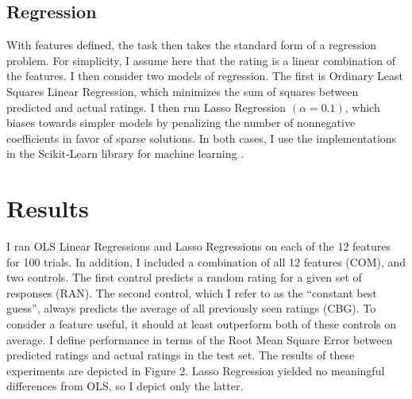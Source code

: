 \subsection{Regression}
With features defined, the task then takes the standard form of a regression problem. For simplicity, I assume here that the rating is a linear combination of the features. I then consider two models of regression. The first is Ordinary Least Squares Linear Regression, which minimizes the sum of squares between predicted and actual ratings. I then run Lasso Regression $(\alpha = 0.1)$, which biases towards simpler models by penalizing the number of nonnegative coefficients in favor of sparse solutions. In both cases, I use the implementations in the Scikit-Learn library for machine learning  \citep{pedregosa2011scikit}.
\section{Results}
I ran OLS Linear Regressions and Lasso Regressions on each of the 12 features for 100 trials. In addition, I included a combination of all 12 features (COM), and two controls. The first control predicts a random rating for a given set of responses (RAN). The second control, which I refer to as the ``constant best guess'', always predicts the average of all previously seen ratings (CBG). To consider a feature useful, it should at least outperform both of these controls on average. I define performance in terms of the Root Mean Square Error between predicted ratings and actual ratings in the test set. The results of these experiments are depicted in Figure 2. Lasso Regression yielded no meaningful differences from OLS, so I depict only the latter.
